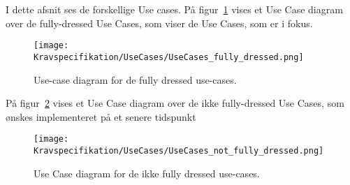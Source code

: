 \label{sec:krav_usecases}
I dette afsnit ses de forskellige Use cases. På figur~\ref{fig:fullydressedusecases} vises et Use Case diagram over de fully-dressed Use Cases, som viser de Use Cases, som er i fokus. 
\begin{figure}[H]
	\centering
	\texttt{[image: Kravspecifikation/UseCases/UseCases\_fully\_dressed.png]}
	\caption{Use-case diagram for de fully dressed use-cases.}
	\label{fig:fullydressedusecases}
\end{figure}

På figur~\ref{fig:ikkefullydressedusecases} vises et Use Case diagram over de ikke fully-dressed Use Cases, som ønskes implementeret på et senere tidspunkt

\begin{figure}[H]
	\centering
	\texttt{[image: Kravspecifikation/UseCases/UseCases\_not\_fully\_dressed.png]}
	\caption{Use Case diagram for de ikke fully dressed use-cases.}
	\label{fig:ikkefullydressedusecases}
\end{figure}

\newpage

\newpage		

\newpage

\newpage

\newpage

\newpage

\newpage

\newpage

